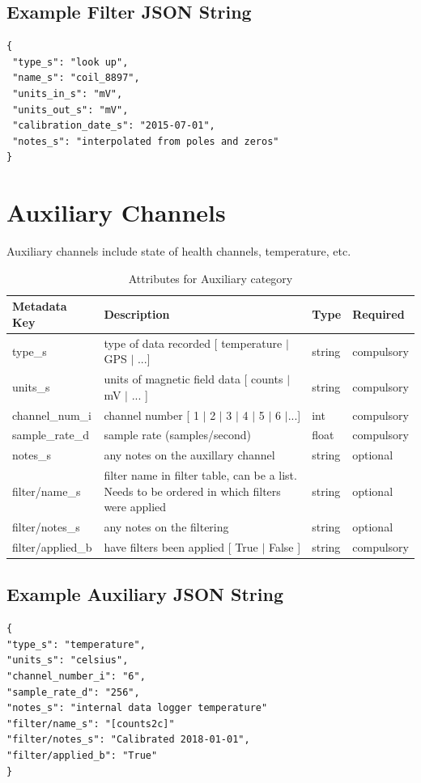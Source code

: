 \documentclass{article}
\begin{document}
\subsection{Example Filter JSON String} 

\begin{verbatim}
{
 "type_s": "look up",
 "name_s": "coil_8897",
 "units_in_s": "mV",
 "units_out_s": "mV",
 "calibration_date_s": "2015-07-01",
 "notes_s": "interpolated from poles and zeros"
}
\end{verbatim}

\newpage

\section{Auxiliary Channels}

Auxiliary channels include state of health channels, temperature, etc.  

\begin{table}[htb!]
	\caption[Attributes for Auxiliary Channel]{Attributes for Auxiliary category}
	\begin{tabular}{|l|p{3in}|l|l|}
		\hline
		\textbf{Metadata Key} & \textbf{Description} & \textbf{Type} & \textbf{Required} \\ \hline
		type\_s & type of data recorded [ temperature $|$ GPS $|$ ...] & string & compulsory \\ \hline
		units\_s & units of magnetic field data [ counts $|$ mV $|$ ... ] & string &  compulsory \\ \hline
		channel\_num\_i & channel number [ 1 $|$ 2 $|$ 3 $|$ 4 $|$ 5 $|$ 6 $|$...] & int &  compulsory \\ \hline
		sample\_rate\_d & sample rate (samples/second) & float &  compulsory \\ \hline
		notes\_s & any notes on the auxillary channel & string &  optional \\ \hline
		filter/name\_s & filter name in filter table, can be a list. Needs to be ordered in which filters were applied & string &  optional \\ \hline
		filter/notes\_s & any notes on the filtering & string &  optional \\ \hline
		filter/applied\_b & have filters been applied [ True $|$ False ] & string & compulsory \\ \hline
	\end{tabular}
	\label{tab:aux}
\end{table}

\subsection{Example Auxiliary JSON String} 

\begin{verbatim}
{
"type_s": "temperature",
"units_s": "celsius",
"channel_number_i": "6",
"sample_rate_d": "256",
"notes_s": "internal data logger temperature"
"filter/name_s": "[counts2c]"
"filter/notes_s": "Calibrated 2018-01-01",
"filter/applied_b": "True"
}
\end{verbatim}
\end{document}
